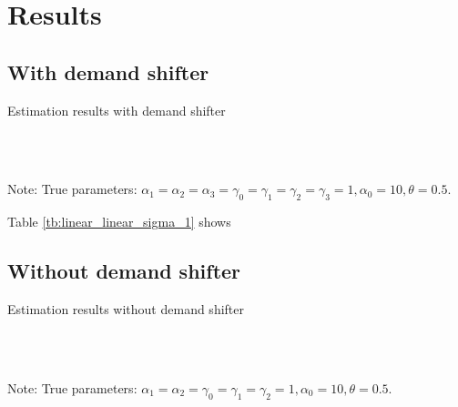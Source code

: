 \documentclass[11pt, a4paper]{article}
\begin{document}
\section{Results}


\subsection{With demand shifter}

\begin{table}[!htbp]
  \begin{center}
      \caption{Estimation results with demand shifter}
      \label{tb:linear_linear_sigma_1} 
      \subfloat[$\sigma=0.001$]{}\\
      \subfloat[$\sigma=0.5$]{}\\
      \subfloat[$\sigma=1.0$]{}
  \end{center}\footnotesize
  Note: True parameters: $\alpha_1 = \alpha_2 = \alpha_3 = \gamma_0 = \gamma_1 = \gamma_2  = \gamma_3 = 1, \alpha_0 = 10, \theta = 0.5.$
\end{table} 



Table \ref{tb:linear_linear_sigma_1} shows




\subsection{Without demand shifter}

\begin{table}[!htbp]
  \begin{center}
      \caption{Estimation results without demand shifter}
      \label{tb:linear_linear_sigma_1_without_demand_shifter_y} 
      \subfloat[$\sigma=0.001$]{}\\
      \subfloat[$\sigma=0.5$]{}\\
      \subfloat[$\sigma=1.0$]{}
  \end{center}\footnotesize
  Note: True parameters: $\alpha_1 = \alpha_2 =  \gamma_0 = \gamma_1 = \gamma_2  =  1, \alpha_0 = 10, \theta = 0.5.$
\end{table} 
\end{document}
